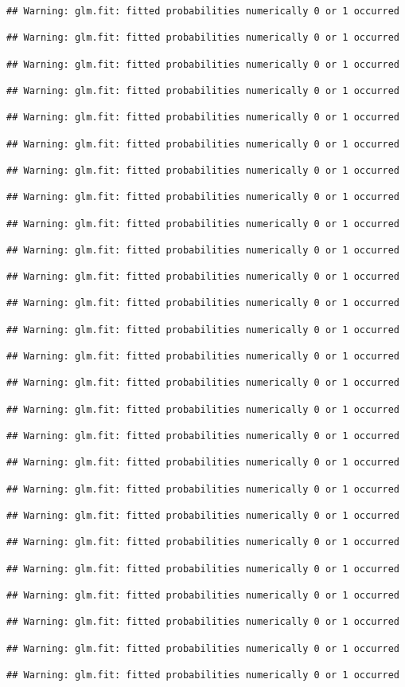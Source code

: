 \documentclass[
]{article}
\begin{document}
\begin{verbatim}
## Warning: glm.fit: fitted probabilities numerically 0 or 1 occurred

## Warning: glm.fit: fitted probabilities numerically 0 or 1 occurred

## Warning: glm.fit: fitted probabilities numerically 0 or 1 occurred

## Warning: glm.fit: fitted probabilities numerically 0 or 1 occurred

## Warning: glm.fit: fitted probabilities numerically 0 or 1 occurred

## Warning: glm.fit: fitted probabilities numerically 0 or 1 occurred

## Warning: glm.fit: fitted probabilities numerically 0 or 1 occurred

## Warning: glm.fit: fitted probabilities numerically 0 or 1 occurred

## Warning: glm.fit: fitted probabilities numerically 0 or 1 occurred

## Warning: glm.fit: fitted probabilities numerically 0 or 1 occurred

## Warning: glm.fit: fitted probabilities numerically 0 or 1 occurred

## Warning: glm.fit: fitted probabilities numerically 0 or 1 occurred

## Warning: glm.fit: fitted probabilities numerically 0 or 1 occurred

## Warning: glm.fit: fitted probabilities numerically 0 or 1 occurred

## Warning: glm.fit: fitted probabilities numerically 0 or 1 occurred

## Warning: glm.fit: fitted probabilities numerically 0 or 1 occurred

## Warning: glm.fit: fitted probabilities numerically 0 or 1 occurred

## Warning: glm.fit: fitted probabilities numerically 0 or 1 occurred

## Warning: glm.fit: fitted probabilities numerically 0 or 1 occurred

## Warning: glm.fit: fitted probabilities numerically 0 or 1 occurred

## Warning: glm.fit: fitted probabilities numerically 0 or 1 occurred

## Warning: glm.fit: fitted probabilities numerically 0 or 1 occurred

## Warning: glm.fit: fitted probabilities numerically 0 or 1 occurred

## Warning: glm.fit: fitted probabilities numerically 0 or 1 occurred

## Warning: glm.fit: fitted probabilities numerically 0 or 1 occurred

## Warning: glm.fit: fitted probabilities numerically 0 or 1 occurred
\end{verbatim}
\end{document}
